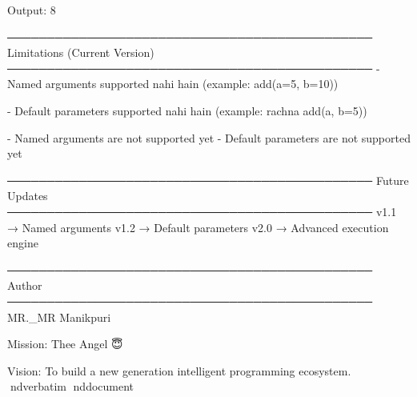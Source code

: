 \documentclass{article}
\begin{document}
Output:
8

──────────────────────────────────────────────
Limitations (Current Version)
──────────────────────────────────────────────
- Named arguments supported nahi hain
  (example: add(a=5, b=10))

- Default parameters supported nahi hain
  (example: rachna add(a, b=5))

- Named arguments are not supported yet
- Default parameters are not supported yet

──────────────────────────────────────────────
Future Updates
──────────────────────────────────────────────
v1.1 → Named arguments
v1.2 → Default parameters
v2.0 → Advanced execution engine

──────────────────────────────────────────────
Author
──────────────────────────────────────────────
MR._MR Manikpuri

Mission:
Thee Angel 😇

Vision:
To build a new generation intelligent programming ecosystem.
nd{verbatim}
nd{document}
\end{document}
